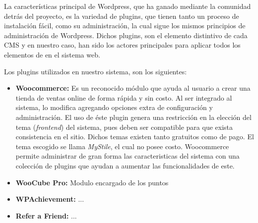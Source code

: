 La características principal de Wordpress, que ha ganado mediante
la comunidad detrás del proyecto, es la variedad de plugins, que
tienen tanto un proceso de instalación fácil, como su administración,
la cual sigue los mismos principios de administración de Wordpress.
Dichos plugins, son el elemento distintivo de cada CMS
y en nuestro caso, han sido los actores principales para aplicar
todos los elementos de {\GAM} en el sistema web.

Los plugins utilizados en nuestro sistema, son los siguientes:

\begin{itemize}
    \item {\bf Woocommerce:}
        Es un reconocido módulo que ayuda al usuario a crear una tienda de
        ventas online de forma rápida y sin costo.
        Al ser integrado al sistema, lo modifica agregando opciones
        extra de configuración y administración.
        El uso de éste plugin genera una restricción en la elección
        del tema (\emph{frontend}) del sistema, pues deben ser compatible
        para que exista consistencia en el sitio.
        Dichos temas existen tanto gratuitos como de pago.
        El tema escogido se llama \emph{MyStile}, el cual no posee costo.
        Woocommerce permite administrar de gran forma las caracteristicas del
        sistema con una colección de plugins que ayudan a aumentar las
        funcionalidades de este.

    \item {\bf WooCube Pro:}
        Modulo encargado de los puntos

    \item {\bf WPAchievement:}
        ...

    \item {\bf Refer a Friend:}
        ...

\end{itemize}
